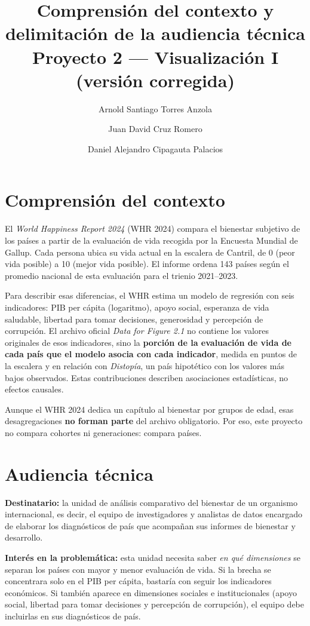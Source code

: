\documentclass[11pt,a4paper]{article}
\title{\textbf{Comprensión del contexto y delimitación de la audiencia técnica}\\[2pt]
\large Proyecto 2 --- Visualización I (versión corregida)}
\author{Arnold Santiago Torres Anzola \and Juan David Cruz Romero \and Daniel Alejandro Cipagauta Palacios}
\date{}
\begin{document}
\maketitle

\section{Comprensión del contexto}

El \textit{World Happiness Report 2024} (WHR 2024) compara el bienestar subjetivo de los países a partir de la
evaluación de vida recogida por la Encuesta Mundial de Gallup. Cada persona ubica su vida actual en la escalera
de Cantril, de 0 (peor vida posible) a 10 (mejor vida posible). El informe ordena 143 países según el promedio
nacional de esta evaluación para el trienio 2021--2023.

Para describir esas diferencias, el WHR estima un modelo de regresión con seis indicadores: PIB per cápita
(logaritmo), apoyo social, esperanza de vida saludable, libertad para tomar decisiones, generosidad y percepción
de corrupción. El archivo oficial \textit{Data for Figure 2.1} no contiene los valores originales de esos
indicadores, sino la \textbf{porción de la evaluación de vida de cada país que el modelo asocia con cada
indicador}, medida en puntos de la escalera y en relación con \textit{Distopía}, un país hipotético con los
valores más bajos observados. Estas contribuciones describen asociaciones estadísticas, no efectos causales.

Aunque el WHR 2024 dedica un capítulo al bienestar por grupos de edad, esas desagregaciones \textbf{no forman
parte} del archivo obligatorio. Por eso, este proyecto no compara cohortes ni generaciones: compara países.

\section{Audiencia técnica}

\textbf{Destinatario:} la unidad de análisis comparativo del bienestar de un organismo internacional, es decir,
el equipo de investigadores y analistas de datos encargado de elaborar los diagnósticos de país que acompañan
sus informes de bienestar y desarrollo.

\textbf{Interés en la problemática:} esta unidad necesita saber \emph{en qué dimensiones} se separan los países
con mayor y menor evaluación de vida. Si la brecha se concentrara solo en el PIB per cápita, bastaría con
seguir los indicadores económicos. Si también aparece en dimensiones sociales e institucionales (apoyo social,
libertad para tomar decisiones y percepción de corrupción), el equipo debe incluirlas en sus diagnósticos de país.
\end{document}
